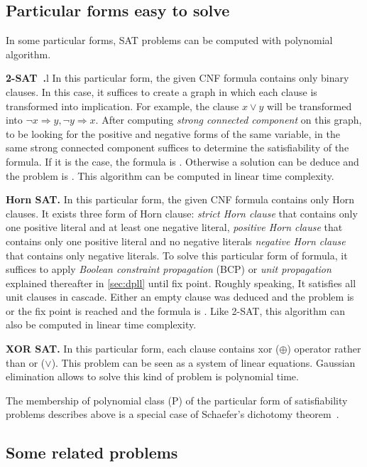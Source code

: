 \subsection{Particular forms easy to solve}
In some particular forms, SAT problems can be computed with polynomial algorithm.


\textbf{2-SAT~\cite{aspvall1979linear}.}l
In this particular form, the given CNF formula contains only binary clauses.
In this case, it suffices to create a graph in which each clause is transformed into implication. For example, the clause $x \lor y$ will be transformed into $ \neg x \Rightarrow y,
\neg y \Rightarrow x$. After computing \emph{strong connected component} on this graph, to be looking for
 the positive and negative forms of the same variable, in the same  strong connected component suffices 
to determine the satisfiability of the formula. If it is the case, the formula is \unsat. Otherwise 
a solution can be deduce and the problem is \sat. This algorithm can be computed in linear time complexity.

\textbf{Horn SAT.} In this particular form, the given CNF formula contains only Horn clauses. It exists three form
of Horn clause: \emph{strict Horn clause} that contains only one positive literal and at least one negative literal,
\emph{positive Horn clause} that contains only one positive literal and no negative literals
\emph{negative Horn clause} that contains only negative literals.
To solve this particular form of formula, it suffices to  apply \emph{Boolean constraint propagation} (BCP) or \emph{unit propagation} explained thereafter in \cref{sec:dpll} until fix point.
Roughly speaking, It satisfies all unit clauses in cascade. Either an empty clause was deduced and the problem
is \unsat or the fix point is reached and the formula is \sat. Like 2-SAT, this algorithm can also be computed
in linear time complexity.


\textbf{XOR SAT.} In this particular form, each clause contains xor ($\oplus$) operator rather than or ($\lor$).
This problem can be seen as a system of linear equations. Gaussian elimination allows to solve this kind of
problem is polynomial time.

The membership of polynomial class (P) of the particular form of satisfiability problems describes above is a special case of Schaefer's dichotomy theorem~\cite{schaefer1978complexity}.

\subsection{Some related problems}

